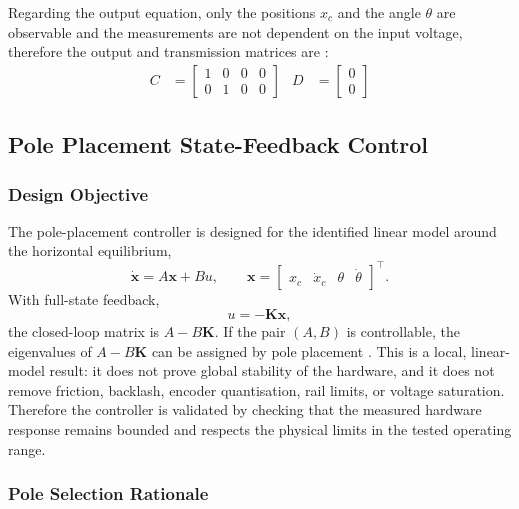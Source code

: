 \documentclass[11pt,a4paper]{article}
\begin{document}
Regarding the output equation, only the positions $x_c$ and the angle $\theta$ are observable and the measurements are not dependent on the input voltage, therefore the output and transmission matrices are :
\begin{align*}
	C                 & =
	\begin{bmatrix}
		1 & 0 & 0 & 0 \\
		0 & 1 & 0 & 0
	\end{bmatrix} &
	D                 & =
	\begin{bmatrix}
		0 \\
		0
	\end{bmatrix}
\end{align*}
\subsection{Pole Placement State-Feedback Control}
\label{sec:pole_placement}

\subsubsection{Design Objective}

The pole-placement controller is designed for the identified linear model around the horizontal equilibrium,
\begin{equation}
	\dot{\mathbf{x}} = A\mathbf{x} + B u, \qquad
	\mathbf{x} = \begin{bmatrix} x_c & \dot{x}_c & \theta & \dot{\theta} \end{bmatrix}^\top.
\end{equation}
With full-state feedback,
\begin{equation}
	u = -\mathbf{K}\mathbf{x},
\end{equation}
the closed-loop matrix is $A - B\mathbf{K}$. If the pair $(A,B)$ is controllable, the eigenvalues of $A-B\mathbf{K}$ can be assigned by pole placement \cite{chen1999linear}. This is a local, linear-model result: it does not prove global stability of the hardware, and it does not remove friction, backlash, encoder quantisation, rail limits, or voltage saturation. Therefore the controller is validated by checking that the measured hardware response remains bounded and respects the physical limits in the tested operating range.

\subsubsection{Pole Selection Rationale}
\end{document}
